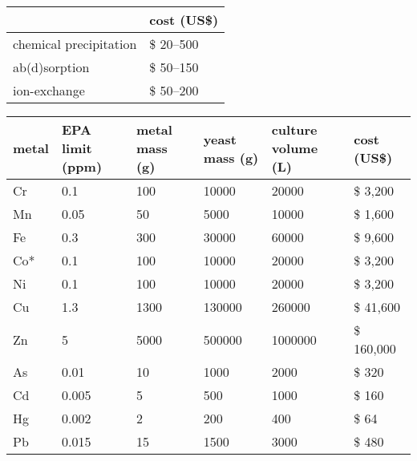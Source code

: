 \documentclass[10pt]{article} %
\begin{document}
\setlength{\tabcolsep}{0.33em} 
\flushleft

	\begin{tabular}{ll}
		\toprule
		\makecell{method}
		& cost (US\$) \\
		\midrule		
		chemical precipitation & \$ 20--500 \\
		ab(d)sorption & \$ 50--150 \\
		ion-exchange & \$ 50--200 \\
		\bottomrule	
	\end{tabular}

	\vspace{2\baselineskip}

	\begin{tabular}{L{1cm}L{1.8cm}L{2.2cm}L{2cm}L{1.8cm}l}
	\toprule
		metal
		& EPA limit (ppm)
		& metal mass (g)
		& yeast mass (g)
		& culture volume (L)
		& cost (US\$) \\
	\midrule
		Cr & 0.1 & 100 & 10000 & 20000 & \$ 3,200 \\
		Mn & 0.05 & 50 & 5000 & 10000 & \$ 1,600 \\
		Fe & 0.3 & 300 & 30000 & 60000 & \$ 9,600 \\
		Co* & 0.1 & 100 & 10000 & 20000 & \$ 3,200 \\
		Ni & 0.1 & 100 & 10000 & 20000 & \$ 3,200 \\
		Cu & 1.3 & 1300 & 130000 & 260000 & \$ 41,600 \\
		Zn & 5 & 5000 & 500000 & 1000000 & \$ 160,000 \\
		As & 0.01 & 10 & 1000 & 2000 & \$ 320 \\
		Cd & 0.005 & 5 & 500 & 1000 & \$ 160 \\
		Hg & 0.002 & 2 & 200 & 400 & \$ 64 \\
		Pb & 0.015 & 15 & 1500 & 3000 & \$ 480 \\
  	\bottomrule
	\end{tabular}
\end{document}
